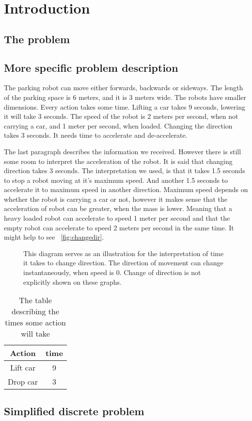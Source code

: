 \section{Introduction}
\subsection{The problem}
\subsection{More specific problem description}
The parking robot can move either forwards, backwards or sideways. The length of
the parking space is 6 meters, and it is 3 meters wide. The robots have smaller
dimensions. Every action takes some time. Lifting a car takes 9 seconds,
lowering it will take 3 seconds. The speed of the robot is 2 meters per second,
when not carrying a car, and 1 meter per second, when loaded. Changing the
direction takes 3 seconds. It needs time to accelerate and de-accelerate. 

The last paragraph describes the information we received. However there is still
some room to interpret the acceleration of the robot. It is said that changing
direction takes 3 seconds. The interpretation we used, is that it takes 1.5
seconds to stop a robot moving at it's maximum speed. And another 1.5 seconds to
accelerate it to maximum speed in another direction. Maximum speed depends on
whether the robot is carrying a car or not, however it makes sense that the
acceleration of robot can be greater, when the mass is lower. Meaning that a
heavy loaded robot can accelerate to speed 1 meter per second and that the empty
robot can accelerate to speed 2 meters per second in the same time. It might
help to see ~\autoref{fig:changedir}.

\begin{figure}[h]
    \caption{This diagram serves as an illustration for the interpretation of
        time it takes to change direction. The direction of movement can change
        instantaneously, when speed is 0. Change of direction is not explicitly shown on
        these graphs. }
    \label{fig:changedir}
\end{figure}

\begin{table}
    \begin{tabular}{| c | c |}
        \hline
        Action & time\\
        \hline
        Lift car & 9\\
        Drop car & 3\\
        \hline
    \end{tabular}
    \caption{The table describing the times some action will take}
\end{table}
\subsection{Simplified discrete problem}
